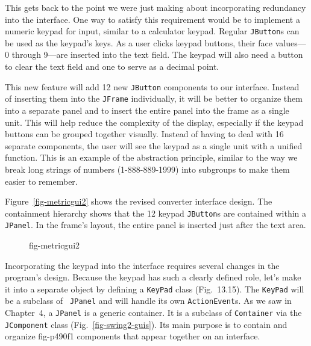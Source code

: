 This gets back to the point we were just making about incorporating
redundancy into the interface.  One way to satisfy this requirement
would be to implement a numeric keypad for input, similar to a
calculator keypad.  Regular {\tt JButton}s can be used as the keypad's
keys.  As a user clicks keypad buttons, their face values---0 through
9---are inserted into the text field.  The keypad will also need a
button to clear the text field and one to serve as a decimal point.

This new feature will add 12 new {\tt JButton} components to our
interface.  Instead of inserting them into the {\tt JFrame}
individually, it will be better to organize them into a separate
panel and to insert the entire panel into the frame as a single
unit.  This will help reduce the complexity of the display, especially
if the keypad buttons can be grouped together visually.   Instead of
having to deal with 16 separate components, the user will see the
keypad as a single unit with a unified function.  This is an example of
the abstraction principle, similar to the way we break long
strings of numbers (1-888-889-1999) into subgroups to make them easier
to remember.


\noindent Figure~\ref{fig-metricgui2} shows the revised  
converter interface design.  The containment hierarchy shows that the 12
keypad {\tt JButton}s are contained within a {\tt JPanel}. In the
frame's layout, the entire panel is inserted just after the text area.


\begin{figure}[tb]
 {fig-metricgui2}

\end{figure}

Incorporating the keypad into the interface requires several changes
in the program's design. Because the keypad has such a clearly defined
role, let's make it into a separate object by defining a {\tt KeyPad}
class (Fig.~13.15). The {\tt KeyPad} will be a subclass of {\tt
JPanel} and will handle its own {\tt ActionEvent}s.  As we saw in
Chapter~4, a {\tt JPanel} is a generic container.  It is a subclass of
{\tt Container} via the {\tt JComponent} class
(Fig.~\ref{fig-swing2-guis}).  Its main purpose is to contain and organize
{fig-p490f1}
components that appear together on an interface.

